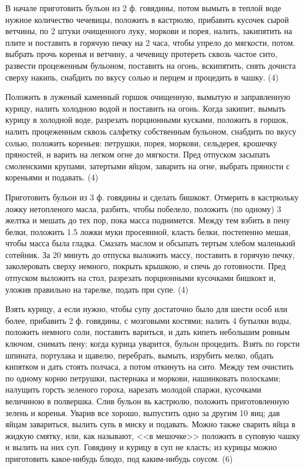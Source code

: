 
В начале приготовить бульон из 2 ф. говядины, потом вымыть в теплой воде нужное количество чечевицы, положить в кастрюлю, прибавить кусочек сырой ветчины, по 2 штуки очищенного луку, моркови и порея, налить, закипятить на плите и поставить в горячую печку на 2 часа, чтобы упрело до мягкости, потом. выбрать прочь коренья и ветчину, а чечевицу протереть сквозь частое сито, развести процеженным бульоном, поставить на огонь, вскипятить, снять дочиста сверху накипь, снабдить по вкусу солью и перцем и процедить в чашку. (4)


Положить в луженый каменный горшок очищенную, вымытую и заправленную курицу, налить холодною водой и поставить на огонь. Когда закипит, вымыть курицу в холодной воде, разрезать порционными кусками, положить в горшок, налить процеженным сквозь салфетку собственным бульоном, снабдить по вкусу солью, положить кореньев: петрушки, порея, моркови, сельдерея, крошечку пряностей, и варить на легком огне до мягкости. Пред отпуском засыпать смоленскими крупами, затертыми яйцом, заварить на огне, выбрать пряности с кореньями и подавать. (4)


Приготовить бульон из 3 ф. говядины и сделать бишкокт. Отмерить в кастрюльку ложку нетопленого масла, разбить, чтобы побелело, положить (по одному) 3 желтка и мешать до тех пор, пока масса поднимется. Между тем взбить в пену белки, положить 1.5 ложки муки просеянной, класть белки, постепенно мешая, чтобы масса была гладка. Смазать маслом и обсыпать тертым хлебом маленький сотейник. За 20 минуть до отпуска выложить массу, поставить в горячую печку, заколеровать сверху немного, покрыть крышкою, и спечь до готовности. Пред отпуском выложить на стол, разрезать порционными кусочками бишкокт и, уложив правильно на тарелке, подать при супе. (4)


Взять курицу, а если нужно, чтобы супу достаточно было для шести особ или более, прибавить 2 ф. говядины, с мозговыми костями; налить 4 бутылки воды, положить немного соли, поставить вариться, и дать кипеть небольшим ровным ключом, снимать пену; когда курица уварится, бульон процедить. Взять по горсти шпината, портулака и щавелю, перебрать, вымыть, изрубить мелко, обдать кипятком и дать стоять полчаса, а потом откинуть на сито. Между тем очистить по одному корню петрушки, пастернака и моркови, нашинковать полосками; налущить горсть зеленого гороха, нарезать молодой спаржи, кусочками величиною в полвершка. Слив бульон вь кастрюлю, положить приготовленную зелень и коренья. Уварив все хорошо, выпустить одно за другим 10 яиц; дав яйцам завариться, вылить супь в миску и подавать. Можно также сварить яйца в жидкую смятку, или, как называют, <<в мешочке>> положить в суповую чашку и вылить на них суп. Говядину и курицу в суп не класть; из курицы можно приготовить какое-нибудь блюдо, под каким-нибудь соусом. (6)

